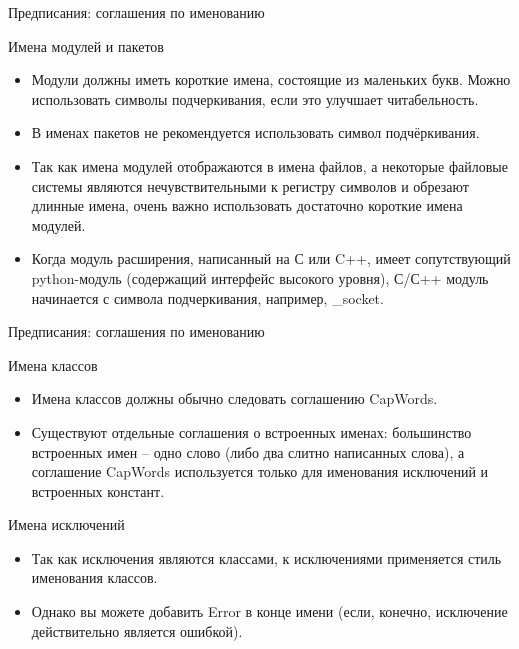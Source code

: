 \documentclass[xcolor=table]{beamer}
\begin{document}
\begin{frame}[fragile]{Предписания: соглашения по именованию}
	\begin{block}{Имена модулей и пакетов}
		\begin{itemize}
			\item Модули должны иметь короткие имена, состоящие из маленьких букв. Можно использовать символы подчеркивания, если это улучшает читабельность. 
			\item В именах пакетов не рекомендуется использовать символ подчёркивания.
			\item Так как имена модулей отображаются в имена файлов, а некоторые файловые системы являются нечувствительными к регистру символов и обрезают длинные имена, очень важно использовать достаточно короткие имена модулей.
			\item Когда модуль расширения, написанный на С или C++, имеет сопутствующий python-модуль (содержащий интерфейс высокого уровня), С/С++ модуль начинается с символа подчеркивания, например, \_socket.
		\end{itemize}			
	\end{block}
\end{frame}

\begin{frame}[fragile]{Предписания: соглашения по именованию}
	\begin{block}{Имена классов}
		\begin{itemize}
			\item Имена классов должны обычно следовать соглашению CapWords.
			\item Существуют отдельные соглашения о встроенных именах: большинство встроенных имен -- одно слово (либо два слитно написанных слова), а соглашение CapWords используется только для именования исключений и встроенных констант.
		\end{itemize}			
	\end{block}
	\begin{block}{Имена исключений}
		\begin{itemize}
			\item Так как исключения являются классами, к исключениями применяется стиль именования классов. 
			\item Однако вы можете добавить Error в конце имени (если, конечно, исключение действительно является ошибкой).
		\end{itemize}			
	\end{block}	
\end{frame}
	
\end{document}
